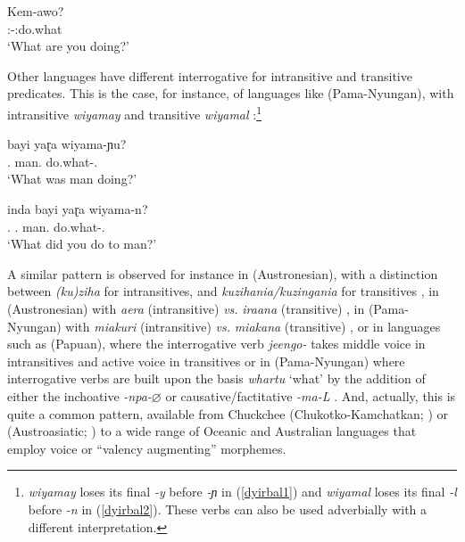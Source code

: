 \documentclass[output=paper]{langsci/langscibook}
\begin{document}
\begin{exe}
\ex \label{erro} 
\sn\gll Kem-awo?\\
\Ssg:\Prs-\Mr{}:do.what\\
\glt `What are you doing?'
\end{exe}


Other languages have different interrogative  for intransitive and
transitive predicates. This is the case, for instance, of languages like
 (Pama-Nyungan), with  intransitive \emph{wiyamay} and transitive
\emph{wiyamal} \citep[55]{Dixon1972}:\footnote{\emph{wiyamay} loses its final
\emph{-y} before \emph{-ɲ} in (\ref{dyirbal1}) and \emph{wiyamal}
loses its final \emph{-l} before \emph{-n} in (\ref{dyirbal2}). These verbs can
also be used adverbially with a different interpretation.}

\begin{exe}
\label{dyirbal}
\ex \label{dyirbal1} 
\sn\gll bayi yaɽa wiyama-ɲu?\\
\Cl.\Nom{} man.\Nom{} do.what-\Ut{}.\Intr{}\\
\glt `What was man doing?'

\ex \label{dyirbal2} 
\sn\gll \ng inda bayi yaɽa wiyama-n?\\
\Ssg.\Erg{} \Cl.\Nom{} man.\Nom{} do.what-\Ut{}.\Tr{}\\
\glt `What did you do to man?'
\end{exe}

A similar pattern is observed for instance in  (Austronesian), with a
distinction between \emph{(ku)ziha} for intransitives, and
\emph{kuzihania/kuzingania} for transitives \citep{vandenberg.bachet2006}, in
 (Austronesian) with \emph{aera} (intransitive) \emph{vs.}
\emph{iraana} (transitive) \parencite[82]{grovesetal1985}, in 
(Pama-Nyungan) with \emph{miakuri} (intransitive) \emph{vs.}
\emph{miakana} (transitive) \citep{blake1979}, or in languages
such as  (Papuan), where the interrogative verb \emph{jeengo-}
takes middle voice in intransitives and active voice in transitives
\citep{onishi1994} or in  (Pama-Nyungan) where interrogative
verbs are built upon the basis \emph{whartu} ‘what’  by the addition of either
the inchoative \emph{-npa-$\varnothing$} or causative/factitative \emph{-ma-L}
\citep{dench1994}. And, actually, this is quite a common pattern, available
from Chuckchee (Chukotko-Kamchatkan; \citealt{spencer1999,dunn1999})
or  (Austroasiatic; \citealt{peterson2010}) to a wide range of
Oceanic and Australian languages that employ voice or ``valency augmenting''
morphemes.
\end{document}
